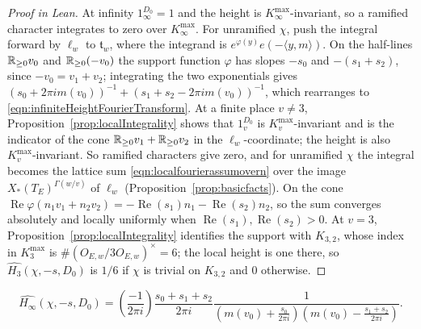 \begin{proof}[Proof in Lean]

\leanok


At infinity $1_\infty^{D_0}=1$ and the height is $K_\infty^{\mathrm{max}}$-invariant, so a ramified character integrates to zero over $K_\infty^{\mathrm{max}}$. For unramified $\chi$, push the integral forward by $\ell_w$ to $\mathfrak t_w$, where the integrand is $e^{\varphi(y)}e(-\langle y,m\rangle)$. On the half-lines $\mathbb{R}_{\geq0}v_0$ and $\mathbb{R}_{\geq0}(-v_0)$ the support function $\varphi$ has slopes $-s_0$ and $-(s_1+s_2)$, since $-v_0=v_1+v_2$; integrating the two exponentials gives $(s_0+2\pi im(v_0))^{-1}+(s_1+s_2-2\pi im(v_0))^{-1}$, which rearranges to \eqref{eqn:infiniteHeightFourierTransform}. At a finite place $v\neq3$, Proposition~\ref{prop:localIntegrality} shows that $1_v^{D_0}$ is $K_v^{\mathrm{max}}$-invariant and is the indicator of the cone $\mathbb{R}_{\geq0}v_1+\mathbb{R}_{\geq0}v_2$ in the $\ell_w$-coordinate; the height is also $K_v^{\mathrm{max}}$-invariant. So ramified characters give zero, and for unramified $\chi$ the integral becomes the lattice sum \eqref{eqn:localfourierassumovern} over the image $X_\ast(T_E)^{\Gamma(w/v)}$ of $\ell_w$ (Proposition~\ref{prop:basicfacts}). On the cone $\operatorname{Re}\varphi(n_1v_1+n_2v_2)=-\operatorname{Re}(s_1)n_1-\operatorname{Re}(s_2)n_2$, so the sum converges absolutely and locally uniformly when $\operatorname{Re}(s_1),\operatorname{Re}(s_2)>0$. At $v=3$, Proposition~\ref{prop:localIntegrality} identifies the support with $K_{3,2}$, whose index in $K_3^{\mathrm{max}}$ is $\#(O_{E,w}/3O_{E,w})^\times=6$; the local height is one there, so $\widehat{H_3}(\chi,-s,D_0)$ is $1/6$ if $\chi$ is trivial on $K_{3,2}$ and $0$ otherwise.

\end{proof}

\begin{equationnode}

\label{eqn:infiniteHeightFourierTransform}


\leanok



\begin{equation*} \widehat{H_\infty}(\chi,-s,D_0) = \left(\frac{-1}{2\pi i}\right) \frac{s_0+s_1+s_2}{2\pi i} \frac{1}{(m(v_0)+\frac{s_0}{2\pi i})(m(v_0)-\frac{s_1+s_2}{2\pi i})}. \end{equation*}

\end{equationnode}

